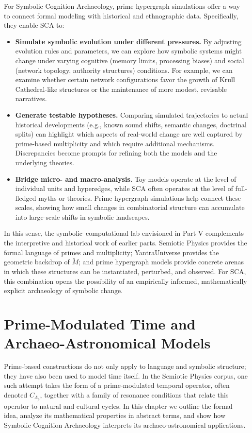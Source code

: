 \documentclass[12]{amsart}
\theoremstyle{plain}
\begin{document}
For Symbolic Cognition Archaeology, prime hypergraph simulations offer a way to connect formal modeling with historical and ethnographic data. Specifically, they enable SCA to:

\begin{itemize}
  \item \textbf{Simulate symbolic evolution under different pressures.} By adjusting evolution rules and parameters, we can explore how symbolic systems might change under varying cognitive (memory limits, processing biases) and social (network topology, authority structures) conditions. For example, we can examine whether certain network configurations favor the growth of Krull Cathedral-like structures or the maintenance of more modest, revisable narratives.
  \item \textbf{Generate testable hypotheses.} Comparing simulated trajectories to actual historical developments (e.g., known sound shifts, semantic changes, doctrinal splits) can highlight which aspects of real-world change are well captured by prime-based multiplicity and which require additional mechanisms. Discrepancies become prompts for refining both the models and the underlying theories.
  \item \textbf{Bridge micro- and macro-analysis.} Toy models operate at the level of individual units and hyperedges, while SCA often operates at the level of full-fledged myths or theories. Prime hypergraph simulations help connect these scales, showing how small changes in combinatorial structure can accumulate into large-scale shifts in symbolic landscapes.
\end{itemize}

In this sense, the symbolic–computational lab envisioned in Part V complements the interpretive and historical work of earlier parts. Semiotic Physics provides the formal language of primes and multiplicity; YantraUniverse provides the geometric backdrop of $\tilde M$; and prime hypergraph models provide concrete arenas in which these structures can be instantiated, perturbed, and observed. For SCA, this combination opens the possibility of an empirically informed, mathematically explicit archaeology of symbolic change.

\section{Prime-Modulated Time and Archaeo-Astronomical Models}

Prime-based constructions do not only apply to language and symbolic structure; they have also been used to model time itself. In the Semiotic Physics corpus, one such attempt takes the form of a prime-modulated temporal operator, often denoted $C_{\Lambda_p}$, together with a family of resonance conditions that relate this operator to natural and cultural cycles. In this chapter we outline the formal idea, analyze its mathematical properties in abstract terms, and show how Symbolic Cognition Archaeology interprets its archaeo-astronomical applications.
\end{document}
